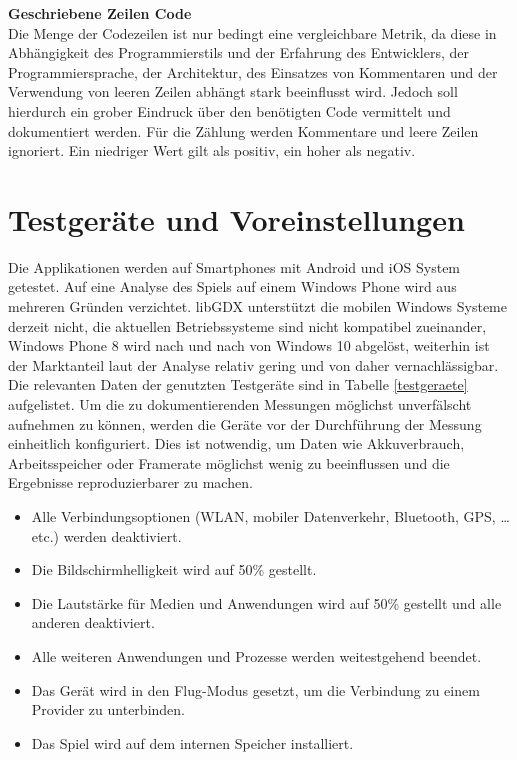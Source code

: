 \bigskip
\textbf{Geschriebene Zeilen Code} \\
Die Menge der Codezeilen ist nur bedingt eine vergleichbare Metrik, da diese in Abhängigkeit des Programmierstils und der Erfahrung des Entwicklers, der Programmiersprache, der Architektur, des Einsatzes von Kommentaren und der Verwendung von leeren Zeilen abhängt stark beeinflusst wird. Jedoch soll hierdurch ein grober Eindruck über den benötigten Code vermittelt und dokumentiert werden. Für die Zählung werden Kommentare und leere Zeilen ignoriert. Ein niedriger Wert gilt als positiv, ein hoher als negativ.


\section{Testgeräte und Voreinstellungen}
Die Applikationen werden auf Smartphones mit Android und iOS System getestet. Auf eine Analyse des Spiels auf einem Windows Phone wird aus mehreren Gründen verzichtet. libGDX unterstützt die mobilen Windows Systeme derzeit nicht, die aktuellen Betriebssysteme sind nicht kompatibel zueinander, Windows Phone 8 wird nach und nach von Windows 10 abgelöst, weiterhin ist der Marktanteil laut der Analyse relativ gering und von daher vernachlässigbar. Die relevanten Daten der genutzten Testgeräte sind in Tabelle \ref{testgeraete} aufgelistet. Um die zu dokumentierenden Messungen möglichst unverfälscht aufnehmen zu können, werden die Geräte vor der Durchführung der Messung einheitlich konfiguriert. Dies ist notwendig, um Daten wie Akkuverbrauch, Arbeitsspeicher oder Framerate möglichst wenig zu beeinflussen und die Ergebnisse reproduzierbarer zu machen.

\begin{itemize}
	\item Alle Verbindungsoptionen (WLAN, mobiler Datenverkehr, Bluetooth, GPS, …etc.) werden deaktiviert.
	\item Die Bildschirmhelligkeit wird auf 50\% gestellt.
	\item Die Lautstärke für Medien und Anwendungen wird auf 50\% gestellt und alle anderen deaktiviert.
	\item Alle weiteren Anwendungen und Prozesse werden weitestgehend beendet.
	\item Das Gerät wird in den Flug-Modus gesetzt, um die Verbindung zu einem Provider zu unterbinden.
	\item Das Spiel wird auf dem internen Speicher installiert.
\end{itemize}

